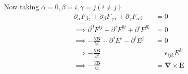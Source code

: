 \documentclass[12pt, letterpaper]{article}
\newcommand*{\1}{\hspace{1pt}}
\begin{document}
Now taking $\alpha=0, \beta=i, \gamma=j (i\neq j)$
\begin{align*}
    \partial_{\alpha} F_{\beta \gamma} + \partial_{\beta} F_{\gamma \alpha} + \partial_{\gamma} F_{\alpha \beta} &= 0\\
    \implies \partial^{0} F^{ij} + \partial^{j} F^{0i} + \partial^{i} F^{j0} &= 0\\
    \implies -\frac{\partial \boldsymbol{B}}{\partial t} + \partial^{j} E^{i} - \partial^{i} E^{j} &= 0\\
    \implies -\frac{\partial \boldsymbol{B}}{\partial t} &= \epsilon_{ijk} E^{k} \\
    \implies -\frac{\partial \boldsymbol{B}}{\partial t} &= \boldsymbol{\nabla} \times \boldsymbol{E} \\
\end{align*}
\end{document}
